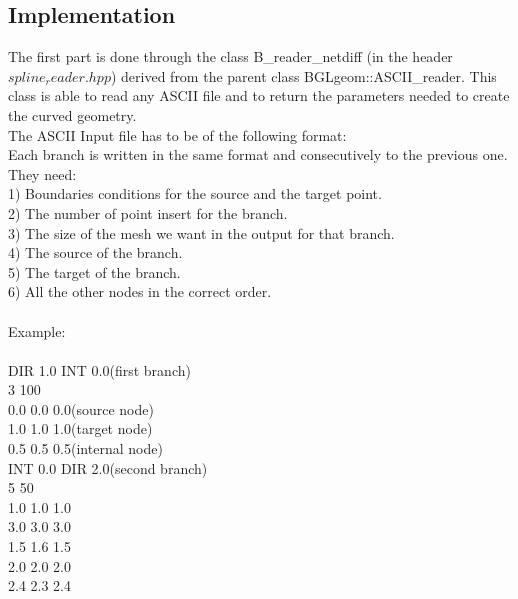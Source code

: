 \documentclass[a4paper]{report}
\newcommand\tab[1][1cm]{\hspace*{#1}}
\begin{document}
\subsection{Implementation}
The first part is done through the class {\selectfont B\_\-reader\_\-netdiff} (in the header $spline_reader.hpp$) derived from the parent class {\selectfont BGLgeom::ASCII\_\-reader}. This class is able to read any ASCII file and to return the parameters needed to create the curved geometry.\\
The  ASCII Input file has to be of the following format:\\
\tab		Each branch is written in the same format and consecutively to the previous one.\\
\tab		They need:\\
\tab\tab		1) Boundaries conditions for the source and the target point.\\
\tab\tab		2) The number of point insert for the branch.\\
\tab\tab		3) The size of the mesh we want in the output for that branch.\\
\tab\tab		4) The source of the branch.\\
\tab\tab		5) The target of the branch.\\
\tab\tab		6) All the other nodes in the correct order.\\
\\ {\selectfont
\tab	Example:\\
\\	
\tab		DIR 1.0 INT 0.0\tab 		(first branch)\\
\tab		3 100					\\
\tab		0.0 0.0 0.0\tab				(source node)\\
\tab		1.0 1.0 1.0\tab				(target node)\\
\tab		0.5 0.5 0.5\tab				(internal node)\\
\tab		INT 0.0 DIR 2.0\tab 		(second branch)\\
\tab		5 50\\
\tab		1.0 1.0 1.0\\
\tab		3.0 3.0 3.0\\
\tab		1.5 1.6 1.5\\
\tab		2.0 2.0 2.0\\
\tab		2.4 2.3 2.4\\
\\
}
\end{document}
